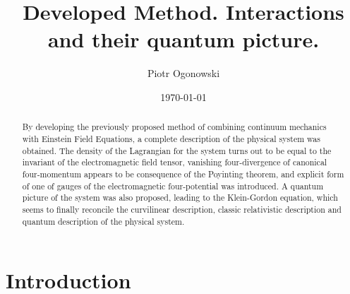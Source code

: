 \documentclass[aps,prx,preprint,groupedaddress,showkeys]{revtex4-2}
\begin{document}
\title{Developed Method. Interactions and their quantum picture.}
\author{Piotr Ogonowski}


\date{\today}

\begin{abstract}
By developing the previously proposed method of combining continuum mechanics with Einstein Field Equations, a complete description of the physical system was obtained. The density of the Lagrangian for the system turns out to be equal to the invariant of the electromagnetic field tensor, vanishing four-divergence of canonical four-momentum appears to be consequence of the Poyinting theorem, and explicit form of one of gauges of the electromagnetic four-potential was introduced. A quantum picture of the system was also proposed, leading to the Klein-Gordon equation, which seems to finally reconcile the curvilinear description, classic relativistic description and quantum description of the physical system.
\end{abstract}


\maketitle

\section{Introduction}
\end{document}
